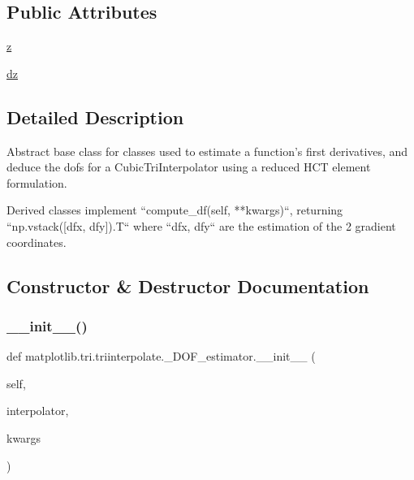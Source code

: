 \subsection*{Public Attributes}
\begin{DoxyCompactItemize}
\item 
\hyperlink{classmatplotlib_1_1tri_1_1triinterpolate_1_1__DOF__estimator_af4538d8f14141b5652b804ae343e7af0}{z}
\item 
\hyperlink{classmatplotlib_1_1tri_1_1triinterpolate_1_1__DOF__estimator_a6ef7582c428debb80338362626b24ce7}{dz}
\end{DoxyCompactItemize}


\subsection{Detailed Description}
\begin{DoxyVerb}Abstract base class for classes used to estimate a function's first
derivatives, and deduce the dofs for a CubicTriInterpolator using a
reduced HCT element formulation.

Derived classes implement ``compute_df(self, **kwargs)``, returning
``np.vstack([dfx, dfy]).T`` where ``dfx, dfy`` are the estimation of the 2
gradient coordinates.
\end{DoxyVerb}
 

\subsection{Constructor \& Destructor Documentation}
\mbox{\label{classmatplotlib_1_1tri_1_1triinterpolate_1_1__DOF__estimator_a3f79e9bc6536e5b67d05ea80b37668a0}} 
\subsubsection{\texorpdfstring{\+\_\+\+\_\+init\+\_\+\+\_\+()}{\_\_init\_\_()}}
{\footnotesize\ttfamily def matplotlib.\+tri.\+triinterpolate.\+\_\+\+D\+O\+F\+\_\+estimator.\+\_\+\+\_\+init\+\_\+\+\_\+ (\begin{DoxyParamCaption}\item[{}]{self,  }\item[{}]{interpolator,  }\item[{}]{kwargs }\end{DoxyParamCaption})}



